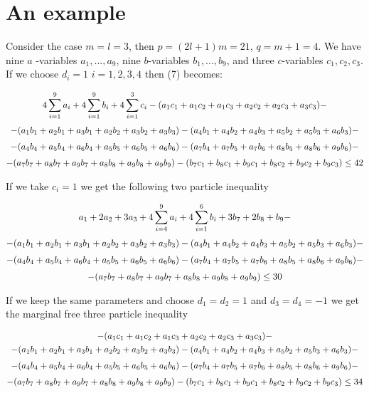 \section{An example}

Consider the case $m=l=3$, then $p=(2l+1)m=21$, $q=m+1=4$. We have nine $a$%
-variables $a_{1},...,a_{9}$, nine $b$-variables $b_{1},...,b_{9}$, and
three $c$-variables $c_{1},c_{2},c_{3}$. If we choose $d_{i}=1$ $i=1,2,3,4$
then (7) becomes:

\begin{gather}
4\sum_{i=1}^{9}a_{i}+4\sum_{i=1}^{9}b_{i}+4%
\sum_{i=1}^{3}c_{i}-(a_{1}c_{1}+a_{1}c_{2}+a_{1}c_{3}+a_{2}c_{2}+a_{2}c_{3}+a_{3}c_{3})-\smallskip
\\
-(a_{1}b_{1}+a_{2}b_{1}+a_{3}b_{1}+a_{2}b_{2}+a_{3}b_{2}+a_{3}b_{3})-(a_{4}b_{1}+a_{4}b_{2}+a_{4}b_{3}+a_{5}b_{2}+a_{5}b_{3}+a_{6}b_{3})-\smallskip
\nonumber \\
-(a_{4}b_{4}+a_{5}b_{4}+a_{6}b_{4}+a_{5}b_{5}+a_{6}b_{5}+a_{6}b_{6})-(a_{7}b_{4}+a_{7}b_{5}+a_{7}b_{6}+a_{8}b_{5}+a_{8}b_{6}+a_{9}b_{6})-\smallskip
\nonumber \\
-(a_{7}b_{7}+a_{8}b_{7}+a_{9}b_{7}+a_{8}b_{8}+a_{9}b_{8}+a_{9}b_{9})-(b_{7}c_{1}+b_{8}c_{1}+b_{9}c_{1}+b_{8}c_{2}+b_{9}c_{2}+b_{9}c_{3})\leq 42
\nonumber
\end{gather}

\bigskip If we take $c_{i}=1$ we get the following two particle inequality

\begin{gather}
a_{1}+2a_{2}+3a_{3}+4\sum_{i=4}^{9}a_{i}+4%
\sum_{i=1}^{6}b_{i}+3b_{7}+2b_{8}+b_{9}-\smallskip \\
-(a_{1}b_{1}+a_{2}b_{1}+a_{3}b_{1}+a_{2}b_{2}+a_{3}b_{2}+a_{3}b_{3})-(a_{4}b_{1}+a_{4}b_{2}+a_{4}b_{3}+a_{5}b_{2}+a_{5}b_{3}+a_{6}b_{3})-\smallskip
\nonumber \\
-(a_{4}b_{4}+a_{5}b_{4}+a_{6}b_{4}+a_{5}b_{5}+a_{6}b_{5}+a_{6}b_{6})-(a_{7}b_{4}+a_{7}b_{5}+a_{7}b_{6}+a_{8}b_{5}+a_{8}b_{6}+a_{9}b_{6})-\smallskip
\nonumber \\
-(a_{7}b_{7}+a_{8}b_{7}+a_{9}b_{7}+a_{8}b_{8}+a_{9}b_{8}+a_{9}b_{9})\leq 30
\nonumber
\end{gather}

If we keep the same parameters and choose $d_{1}=d_{2}=1$ and $%
d_{3}=d_{4}=-1 $ we get the marginal free three particle inequality

\begin{gather}
-(a_{1}c_{1}+a_{1}c_{2}+a_{1}c_{3}+a_{2}c_{2}+a_{2}c_{3}+a_{3}c_{3})- \\
-(a_{1}b_{1}+a_{2}b_{1}+a_{3}b_{1}+a_{2}b_{2}+a_{3}b_{2}+a_{3}b_{3})-(a_{4}b_{1}+a_{4}b_{2}+a_{4}b_{3}+a_{5}b_{2}+a_{5}b_{3}+a_{6}b_{3})-\smallskip
\nonumber \\
-(a_{4}b_{4}+a_{5}b_{4}+a_{6}b_{4}+a_{5}b_{5}+a_{6}b_{5}+a_{6}b_{6})-(a_{7}b_{4}+a_{7}b_{5}+a_{7}b_{6}+a_{8}b_{5}+a_{8}b_{6}+a_{9}b_{6})-\smallskip
\nonumber \\
-(a_{7}b_{7}+a_{8}b_{7}+a_{9}b_{7}+a_{8}b_{8}+a_{9}b_{8}+a_{9}b_{9})-(b_{7}c_{1}+b_{8}c_{1}+b_{9}c_{1}+b_{8}c_{2}+b_{9}c_{2}+b_{9}c_{3})\leq 34
\nonumber
\end{gather}

